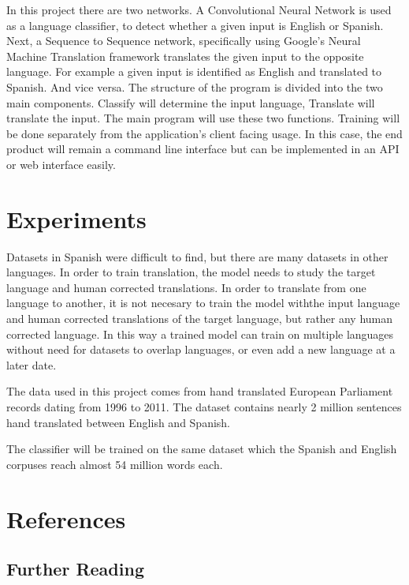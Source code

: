 \documentclass[10pt,a4paper]{article}
\begin{document}
  In this project there are two networks. A Convolutional Neural Network is used as a language classifier, to detect whether a given input is English or Spanish. Next, a Sequence to Sequence network, specifically using Google's Neural Machine Translation framework translates the given input to the opposite language. For example a given input is identified as English and translated to Spanish. And vice versa. The structure of the program is divided into the two main components. Classify will determine the input language, Translate will translate the input. The main program will use these two functions. Training will be done separately from the application's client facing usage. In this case, the end product will remain a command line interface but can be implemented in an API or web interface easily.

\section{Experiments}

  Datasets in Spanish were difficult to find, but there are many datasets in other languages. In order to train translation, the model needs to study the target language and human corrected translations. In order to translate from one language to another, it is not necesary to train the model withthe input language and human corrected translations of the target language, but rather any human corrected language. In this way a trained model can train on multiple languages without need for datasets to overlap languages, or even add a new language at a later date.

  The data used in this project comes from hand translated European Parliament records dating from 1996 to 2011. The dataset contains nearly 2 million sentences hand translated between English and Spanish.

  The classifier will be trained on the same dataset which the Spanish and English corpuses reach almost 54 million words each.

\clearpage

\section{References}

\subsection{Further Reading}
\end{document}
